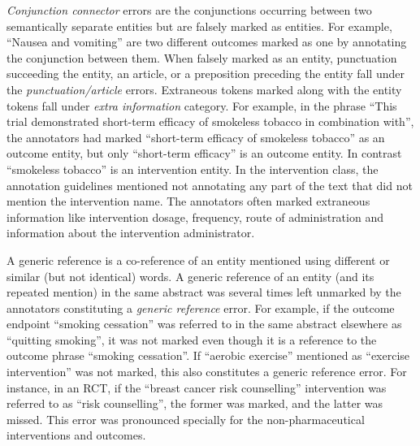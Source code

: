 \documentclass[10.7pt,]{article}
\begin{document}
\textit{Conjunction connector} errors are the conjunctions occurring between two semantically separate entities but are falsely marked as entities.
For example, ``Nausea and vomiting'' are two different outcomes marked as one by annotating the conjunction between them.
When falsely marked as an entity, punctuation succeeding the entity, an article, or a preposition preceding the entity fall under the \textit{punctuation/article} errors.
Extraneous tokens marked along with the entity tokens fall under \textit{extra information} category.
For example, in the phrase ``This trial demonstrated short-term efficacy of smokeless tobacco in combination with'', the annotators had marked ``short-term efficacy of smokeless tobacco'' as an outcome entity, but only ``short-term efficacy'' is an outcome entity.
In contrast ``smokeless tobacco'' is an intervention entity. 
In the intervention class, the annotation guidelines mentioned not annotating any part of the text that did not mention the intervention name.
The annotators often marked extraneous information like intervention dosage, frequency, route of administration and information about the intervention administrator.




A generic reference is a co-reference of an entity mentioned using different or similar (but not identical) words. 
A generic reference of an entity (and its repeated mention) in the same abstract was several times left unmarked by the annotators constituting a \textit{generic reference} error.
For example, if the outcome endpoint ``smoking cessation'' was referred to in the same abstract elsewhere as ``quitting smoking'', it was not marked even though it is a reference to the outcome phrase ``smoking cessation''.
If ``aerobic exercise'' mentioned as ``exercise intervention'' was not marked, this also constitutes a generic reference error.
For instance, in an RCT, if the ``breast cancer risk counselling'' intervention was referred to as ``risk counselling'', the former was marked, and the latter was missed.
This error was pronounced specially for the non-pharmaceutical interventions and outcomes.
\end{document}
